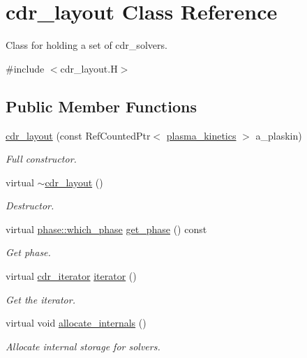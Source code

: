\hypertarget{classcdr__layout}{}\section{cdr\+\_\+layout Class Reference}
\label{classcdr__layout}


Class for holding a set of cdr\+\_\+solvers.  




{\ttfamily \#include $<$cdr\+\_\+layout.\+H$>$}

\subsection*{Public Member Functions}
\begin{DoxyCompactItemize}
\item 
\hyperlink{classcdr__layout_a4ae1b652df2cfb92d28db0b602b65f19}{cdr\+\_\+layout} (const Ref\+Counted\+Ptr$<$ \hyperlink{classplasma__kinetics}{plasma\+\_\+kinetics} $>$ a\+\_\+plaskin)
\begin{DoxyCompactList}\small\item\em Full constructor. \end{DoxyCompactList}\item 
virtual \hyperlink{classcdr__layout_ac9f79d5f729214184d29c8cd324ef71e}{$\sim$cdr\+\_\+layout} ()
\begin{DoxyCompactList}\small\item\em Destructor. \end{DoxyCompactList}\item 
virtual \hyperlink{namespacephase_a23c76f548a5eb1955ed8c929c541108b}{phase\+::which\+\_\+phase} \hyperlink{classcdr__layout_ace4bd779b4bd8e4c214d2e93bc665648}{get\+\_\+phase} () const 
\begin{DoxyCompactList}\small\item\em Get phase. \end{DoxyCompactList}\item 
virtual \hyperlink{classcdr__iterator}{cdr\+\_\+iterator} \hyperlink{classcdr__layout_a4073d2cb1c2d0ca05782483abbd0b327}{iterator} ()
\begin{DoxyCompactList}\small\item\em Get the iterator. \end{DoxyCompactList}\item 
virtual void \hyperlink{classcdr__layout_a8449118e3c1f7ff5fca7102abb7effcc}{allocate\+\_\+internals} ()
\begin{DoxyCompactList}\small\item\em Allocate internal storage for solvers. \end{DoxyCompactList}\item 

\end{DoxyCompactItemize}

